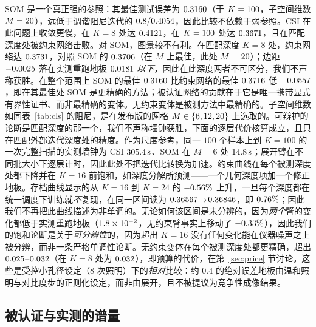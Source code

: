 \documentclass[UTF8,a4paper,11pt]{ctexart}
\newcommand{\numv}[1]{#1}
\begin{document}
SOM 是一个真正强的参照：其最佳测试误差为 $\numv{\NumSomBest}$（于 $K=\numv{\NumSomBestK}$，子空间维数 $M=\numv{\NumSomBestM}$），远低于调谐阻尼迭代的 $\numv{\NumClsSweepBest}$，因此比较不依赖于弱参照。CSI 在此问题上收敛更慢，在 $K=8$ 处达 $\numv{\NumCsiAtKEight}$，在 $K=\numv{\NumCsiBestK}$ 处达 $\numv{\NumCsiBest}$，且在匹配深度处被约束网络击败。对 SOM，图景较不有利。在匹配深度 $K=8$ 处，约束网络达 $\numv{\NumConsEight}$，对照 SOM 的 $\numv{\NumSomAtKEight}$（在 $M$ 上最佳，此处 $M=\numv{\NumSomAtKEightM}$）；边距 $\numv{\NumSomMargKEight}$ 落在实测重跑地板 $\numv{\NumRepFloorMaxRre}$ \emph{以下}，因此在此深度两者不可区分，我们不声称获胜。在整个范围上 SOM 的最佳 $\numv{\NumSomBest}$ 比约束网络的最佳 $\numv{\NumConsBest}$ 低 $\numv{\NumSomMargBest}$，即在其最佳处 SOM 是更精确的方法；被认证网络的贡献在于它是唯一携带显式有界性证书、而非最精确的变体。无约束变体是被测方法中最精确的。子空间维数如同表~\ref{tab:cls} 的阻尼，是在发布版的网格 $M\in\{\numv{\NumSomMGrid}\}$ 上选取的。可辩护的论断是匹配深度的那一个，我们不声称墙钟获胜，下面的逐层代价核算成立，且只在匹配外部迭代深度处的精度。作为尺度参考，同一 $100$ 个样本上到 $K=100$ 的一次完整扫描的实测墙钟为 CSI $\SI{\numv{\NumCsiSecHundred}}{\second}$、SOM 在 $M=6$ 处 $\SI{\numv{\NumSomSecHundred}}{\second}$；展开臂在不同批大小下逐层计时，因此此处不把迭代比转换为加速。约束曲线在每个被测深度处都下降并在 $K=16$ 前饱和，如深度分解所预测——一个几何深度项加一个修正地板。存档曲线显示的从 $K=16$ 到 $K=24$ 的 $\numv{\NumDepDeltaArchPct}\%$ 上升，一旦每个深度都在统一调度下训练就\emph{不}复现，在同一区间读为 $\numv{\NumDepUniConsSixteen}\!\to\!\numv{\NumDepUniConsTwentyFour}$，即 $\numv{\NumDepDeltaUniPct}\%$；因此我们不再把此曲线描述为非单调的。无论如何该区间是未分辨的，因为\emph{两个}臂的变化都低于实测重跑地板（$\numv{\NumDepUniFloor}$，无约束臂事实上移动了 $\numv{\NumDepDeltaUncUniPct}\%$），因此我们的饱和论断是关于\emph{可分辨性}的，因为超出 $K=16$ 没有任何变化能在仪器噪声之上被分辨，而非一条严格单调性论断。无约束变体在每个被测深度处都更精确，超出 $\numv{\NumPriceDeltaLo}$--$\numv{\NumPriceDeltaHi}$（在 $K=8$ 处为 $\numv{\NumPriceDelta}$），即预算的代价，在第~\ref{sec:price} 节讨论。这些是受控小孔径设定（$8$ 次照明）下的\emph{相对}比较：约 $0.4$ 的绝对误差地板由温和照明与对比度步的正则化设定，而非由展开，且不被提议为竞争性成像结果。

\subsection{被认证与实测的谱量}
\end{document}
